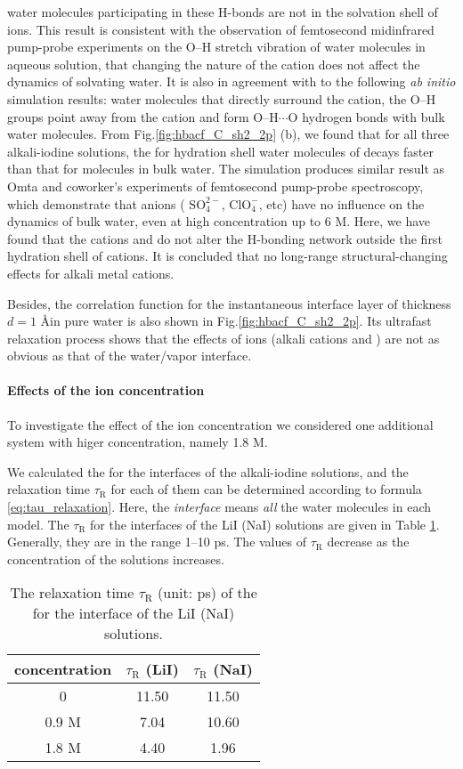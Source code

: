 water molecules participating in these H-bonds are not in the solvation shell of ions. 
This result is consistent with the observation of femtosecond midinfrared pump-probe experiments 
on the O--H stretch vibration of water molecules in aqueous solution,
that changing the nature of the cation does not affect the dynamics of solvating water.\cite{Kropman2001}
It is also in agreement with to the following \emph{ab initio} simulation results: water molecules that directly surround the cation, the O--H groups point
away from the cation and form O--H$\cdots$O hydrogen bonds with bulk water molecules.\cite{Hashimoto1994,Ramaniah1998,Kropman2001}
From Fig.\thinspace\ref{fig:hbacf_C_sh2_2p} (b), we found that for all three alkali-iodine solutions, the \CHB for hydration shell water molecules 
of \I decays faster than that for molecules in bulk water.
The simulation produces similar result as Omta and coworker's experiments of femtosecond pump-probe spectroscopy,
which demonstrate that anions ( $\text{SO}^{2-}_4$, $\text{ClO}^-_4$, etc) have no influence on the dynamics of bulk water, 
even at high concentration up to 6 M.\cite{Omta2003, ZhangYanjie2006} 
Here, we have found that the cations \Li and \Na do not alter the H-bonding network outside the first hydration shell of cations. 
It is concluded that no long-range structural-changing effects for alkali metal cations.

Besides, the correlation function \CHB for the instantaneous interface layer of thickness $d=1$ \AA in pure water is also shown in Fig.\ref{fig:hbacf_C_sh2_2p}.
Its ultrafast relaxation process shows that the effects of ions (alkali cations and \I) are not as obvious as that of the water/vapor interface.
\FloatBarrier
\paragraph{Effects of the ion concentration}
To investigate the effect of the ion concentration we considered one additional system with higer concentration, namely 1.8 M.

We calculated the \CHB for the interfaces of the alkali-iodine solutions, 
and the relaxation time $\tau_{\text{R}}$ for each of them can be determined according to formula \ref{eq:tau_relaxation}. 
Here, the \emph{interface} means \emph{all} the water molecules in each model. 
The $\tau_{\text{R}}$ for the interfaces of the LiI (NaI) solutions are given in 
Table \ref{tab:tau_hb}. Generally, they are in the range 1--10 ps. 
The values of $\tau_{\text{R}}$ decrease as the concentration of the solutions increases.
\begin{table}[htbp]
\centering
\caption{\label{tab:tau_hb} 
  The relaxation time $\tau_{\text{R}}$ (unit: ps) of the \CHB  for the interface of the LiI (NaI) solutions.}
\begin{tabular}{ccc}
  concentration  & $\tau_{\text{R}}$ (LiI) & $\tau_{\text{R}}$ (NaI) \\
\hline
  0 & 11.50 & 11.50 \\
  0.9 M & 7.04 & 10.60 \\
  1.8 M & 4.40 & 1.96 
\end{tabular}
\end{table}

